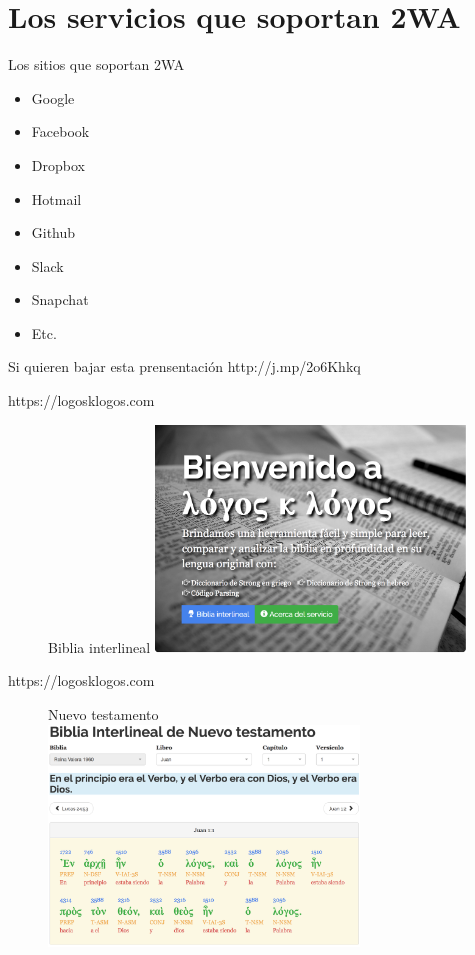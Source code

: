 \documentclass[11pt]{beamer}
\begin{document}
\section{Los servicios que soportan 2WA}
\begin{frame}
  \begin{block}{Los sitios que soportan 2WA}
    \begin{itemize}
      \item Google
      \item Facebook
      \item Dropbox
      \item Hotmail
      \item Github
      \item Slack
      \item Snapchat
      \item Etc.
    \end{itemize}
  \end{block}
\end{frame}
\begin{frame}
  \begin{block}{Si quieren bajar esta prensentaci\'on}
    http://j.mp/2o6Khkq
  \end{block}
\end{frame}
\begin{frame}{https://logosklogos.com}
  \begin{figure}{Biblia interlineal}
    \includegraphics[width=3.25in]{logos-home.png}
  \end{figure}
\end{frame}
\begin{frame}{https://logosklogos.com}
  \begin{figure}{Nuevo testamento}
    \includegraphics[width=3.25in]{logos-griego.png}
  \end{figure}
\end{frame}
\end{document}
